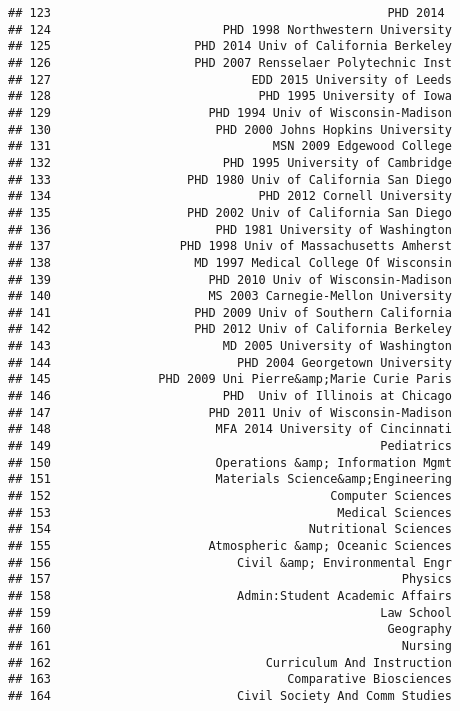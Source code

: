 \documentclass[
]{article}
\begin{document}
\begin{verbatim}
## 123                                               PHD 2014 
## 124                        PHD 1998 Northwestern University
## 125                    PHD 2014 Univ of California Berkeley
## 126                    PHD 2007 Rensselaer Polytechnic Inst
## 127                            EDD 2015 University of Leeds
## 128                             PHD 1995 University of Iowa
## 129                      PHD 1994 Univ of Wisconsin-Madison
## 130                       PHD 2000 Johns Hopkins University
## 131                               MSN 2009 Edgewood College
## 132                        PHD 1995 University of Cambridge
## 133                   PHD 1980 Univ of California San Diego
## 134                             PHD 2012 Cornell University
## 135                   PHD 2002 Univ of California San Diego
## 136                       PHD 1981 University of Washington
## 137                  PHD 1998 Univ of Massachusetts Amherst
## 138                    MD 1997 Medical College Of Wisconsin
## 139                      PHD 2010 Univ of Wisconsin-Madison
## 140                      MS 2003 Carnegie-Mellon University
## 141                    PHD 2009 Univ of Southern California
## 142                    PHD 2012 Univ of California Berkeley
## 143                        MD 2005 University of Washington
## 144                          PHD 2004 Georgetown University
## 145               PHD 2009 Uni Pierre&amp;Marie Curie Paris
## 146                        PHD  Univ of Illinois at Chicago
## 147                      PHD 2011 Univ of Wisconsin-Madison
## 148                       MFA 2014 University of Cincinnati
## 149                                              Pediatrics
## 150                       Operations &amp; Information Mgmt
## 151                       Materials Science&amp;Engineering
## 152                                       Computer Sciences
## 153                                        Medical Sciences
## 154                                    Nutritional Sciences
## 155                      Atmospheric &amp; Oceanic Sciences
## 156                          Civil &amp; Environmental Engr
## 157                                                 Physics
## 158                          Admin:Student Academic Affairs
## 159                                              Law School
## 160                                               Geography
## 161                                                 Nursing
## 162                              Curriculum And Instruction
## 163                                 Comparative Biosciences
## 164                          Civil Society And Comm Studies

\end{verbatim}
\end{document}

